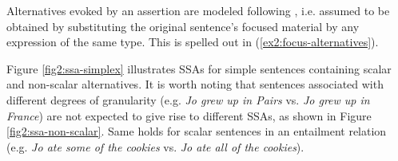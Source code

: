 \begin{exe}
	\label{ex2:ssa}
\end{exe}

Alternatives evoked by an assertion are modeled following \citet{Rooth1992}, i.e. assumed to be obtained by substituting the original sentence's focused material by any expression of the same type. This is spelled out in (\ref{ex2:focus-alternatives}). 

\begin{exe}
	\label{ex2:focus-alternatives}
\end{exe} 

Figure \ref{fig2:ssa-simplex} illustrates SSAs for simple sentences containing scalar and non-scalar alternatives. It is worth noting that sentences associated with different degrees of granularity (e.g. \textit{Jo grew up in Pairs} vs. \textit{Jo grew up in France}) are not expected to give rise to different SSAs, as shown in Figure \ref{fig2:ssa-non-scalar}. Same holds for scalar sentences in an entailment relation (e.g. \textit{Jo ate some of the cookies} vs. \textit{Jo ate all of the cookies}).


